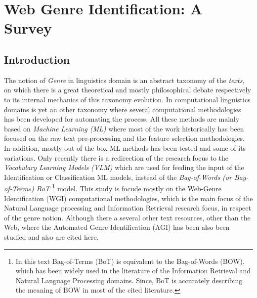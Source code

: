 
\chapter{Web Genre Identification: A Survey}

\label{chap:relevant_work}


\newcommand{\keyword}[1]{\textbf{#1}}
\newcommand{\tabhead}[1]{\textbf{#1}}
\newcommand{\code}[1]{\texttt{#1}}
\newcommand{\file}[1]{\texttt{\bfseries#1}}
\newcommand{\option}[1]{\texttt{\itshape#1}}


\section{Introduction}\label{chap:relevant_work:sec:intro}

The notion of \textit{Genre} in linguistics domain is an abstract taxonomy of the \textit{texts}, on which there is a great theoretical and mostly philosophical debate respectively to its internal mechanics of this taxonomy evolution. In computational linguistics domains is yet an other taxonomy where several computational methodologies has been developed for automating the process. All these methods are mainly based on \textit{Machine Learning (ML)} where most of the work historically has been focused on the raw text pre-processing and the feature selection methodologies. In addition, mostly out-of-the-box ML methods has been tested and some of its variations. Only recently there is a redirection of the research focus to the \textit{Vocabulary Learning Models (VLM)} which are used for feeding the input of the Identification or Classification ML models, instead of the \textit{Bag-of-Words (or Bag-of-Terms) BoT }\footnote{In this text Bag-of-Terms (BoT) is equivalent to the Bag-of-Words  (BOW), which has been widely used in the literature of the Information Retrieval and Natural Language Processing domains. Since, BoT is accurately describing the meaning of BOW in most of the cited literature.} model. This study is focude mostly on the Web-Genre Identification (WGI) computational methodologies, which is the main focus of the Natural Language processing and Information Retrieval research focus, in respect of the genre notion. Although there a several other text resources, other than the Web, where the Automated Genre Identification (AGI) has been also been studied and also are cited here.

